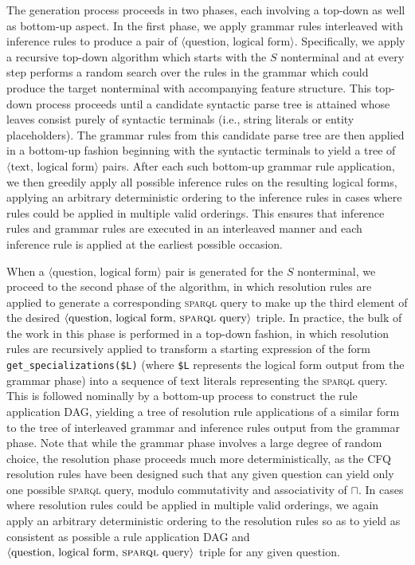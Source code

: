 \documentclass[letterpaper]{article}
\newcommand{\SPARQL}{\textsc{sparql}}
\begin{document}
The generation process proceeds in two phases, each involving a top-down as well as bottom-up aspect. In the first phase, we apply grammar rules interleaved with inference rules to produce a pair of $\langle \text{question, logical form} \rangle$. Specifically, we apply a recursive top-down algorithm which starts with the $S$ nonterminal and at every step performs a random search over the rules in the grammar which could produce the target nonterminal with accompanying feature structure. This top-down process proceeds until a candidate syntactic parse tree is attained whose leaves consist purely of syntactic terminals (i.e., string literals or entity placeholders). The grammar rules from this candidate parse tree are then applied in a bottom-up fashion beginning with the syntactic terminals to yield a tree of $\langle \text{text, logical form} \rangle$ pairs. After each such bottom-up grammar rule application, we then greedily apply all possible inference rules on the resulting logical forms, applying an arbitrary deterministic ordering to the inference rules in cases where rules could be applied in multiple valid orderings. This ensures that inference rules and grammar rules are executed in an interleaved manner and each inference rule is applied at the earliest possible occasion.

When a $\langle \text{question, logical form} \rangle$ pair is generated for the $S$ nonterminal, we proceed to the second phase of the algorithm, in which resolution rules are applied to generate a corresponding \SPARQL{} query to make up the third element of the desired $\langle \text{question, logical form, \SPARQL{} query} \rangle$ triple. In practice, the bulk of the work in this phase is performed in a top-down fashion, in which resolution rules are recursively applied to transform a starting expression of the form \texttt{get\_specializations(\$L)} (where \texttt{\$L} represents the logical form output from the grammar phase) into a sequence of text literals representing the \SPARQL{} query. This is followed nominally by a bottom-up process to construct the rule application DAG, yielding a tree of resolution rule applications of a similar form to the tree of interleaved grammar and inference rules output from the grammar phase. Note that while the grammar phase involves a large degree of random choice, the resolution phase proceeds much more deterministically, as the CFQ resolution rules have been designed such that any given question can yield only one possible \SPARQL{} query, modulo commutativity and associativity of $\sqcap$. In cases where resolution rules could be applied in multiple valid orderings, we again apply an arbitrary deterministic ordering to the resolution rules so as to yield as consistent as possible a rule application DAG and $\langle \text{question, logical form, \SPARQL{} query} \rangle$ triple for any given question.
\end{document}
